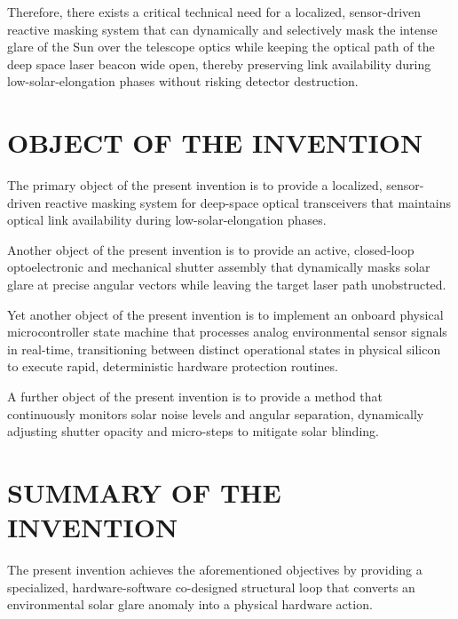 \documentclass[12pt,a4paper]{article}
\begin{document}
Therefore, there exists a critical technical need for a localized, sensor-driven reactive masking system that can dynamically and selectively mask the intense glare of the Sun over the telescope optics while keeping the optical path of the deep space laser beacon wide open, thereby preserving link availability during low-solar-elongation phases without risking detector destruction.

\section*{OBJECT OF THE INVENTION}
The primary object of the present invention is to provide a localized, sensor-driven reactive masking system for deep-space optical transceivers that maintains optical link availability during low-solar-elongation phases.

Another object of the present invention is to provide an active, closed-loop optoelectronic and mechanical shutter assembly that dynamically masks solar glare at precise angular vectors while leaving the target laser path unobstructed.

Yet another object of the present invention is to implement an onboard physical microcontroller state machine that processes analog environmental sensor signals in real-time, transitioning between distinct operational states in physical silicon to execute rapid, deterministic hardware protection routines.

A further object of the present invention is to provide a method that continuously monitors solar noise levels and angular separation, dynamically adjusting shutter opacity and micro-steps to mitigate solar blinding.

\section*{SUMMARY OF THE INVENTION}
The present invention achieves the aforementioned objectives by providing a specialized, hardware-software co-designed structural loop that converts an environmental solar glare anomaly into a physical hardware action. 
\end{document}

